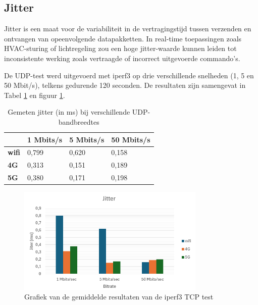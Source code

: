 \subsection{Jitter}
Jitter is een maat voor de variabiliteit in de vertragingstijd tussen verzenden en ontvangen van opeenvolgende datapakketten. In real-time toepassingen zoals HVAC-sturing of lichtregeling zou een hoge jitter-waarde kunnen leiden tot inconsistente werking zoals vertraagde of incorrect uitgevoerde commando’s.

De UDP-test werd uitgevoerd met iperf3 op drie verschillende snelheden (1, 5 en 50 Mbit/s), telkens gedurende 120 seconden. De resultaten zijn samengevat in Tabel \ref{tab:jitter} en figuur \ref{fig:jitter}.

\begin{table}[]
    \caption{Gemeten jitter (in ms) bij verschillende UDP-bandbreedtes}
    \begin{tabular}{l l l l}
        \cline{2-4}
        & \textbf{1 Mbits/s} & \textbf{5 Mbits/s} & \textbf{50 Mbits/s} \\ \hline
        \multicolumn{1}{l}{\textbf{wifi}} & 0,799              & 0,620                 & 0,158               \\ \hline
        \multicolumn{1}{l}{\textbf{4G}}   & 0,313                & 0,151                & 0,189               \\ \hline
        \multicolumn{1}{l}{\textbf{5G}}   & 0,380               & 0,171                & 0,198               \\ \hline
    \end{tabular}
    
    \label{tab:jitter}
\end{table}
\begin{figure}

    \includegraphics[width=0.8\textwidth]{../graphics/Jitter_grafiek.png}
    \caption[Grafiek van de gemiddelde resultaten van de iperf3 TCP test]{\label{fig:jitter}Grafiek van de gemiddelde resultaten van de iperf3 TCP test}
\end{figure}
